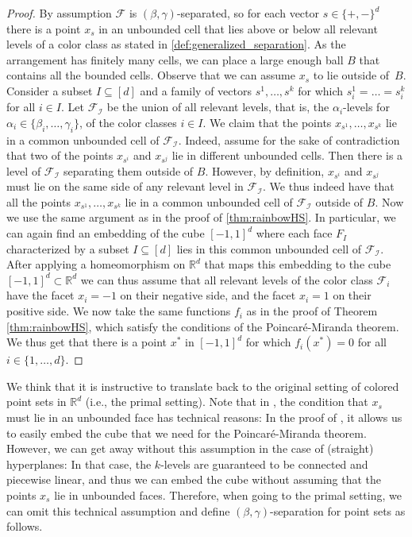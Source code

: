 \documentclass[11pt]{article}
\newcommand{\R}{\mathbb{R}}
\begin{document}
\begin{proof}
By assumption $\mathcal{F}$ is $(\beta,\gamma)$-separated, so for each vector $s \in \{+, -\}^d$ there is a point $x_s$ in an unbounded cell that lies above or below all relevant levels of a color class as stated in \cref{def:generalized_separation}. As the arrangement has finitely many cells, we can place a large enough ball $B$ that contains all the bounded cells. Observe that we can assume $x_s$ to lie outside of~$B$. Consider a subset $I\subseteq [d]$ and a family of vectors $s^1,\ldots,s^k$ for which $s_i^1=\ldots =s_i^k$ for all $i\in I$. Let $\mathcal{F_{I}}$ be the union of all relevant levels, that is, the $\alpha_i$-levels for $\alpha_i \in \{\beta_i, \ldots, \gamma_i\}$, of the color classes $i \in I$. We claim that the points $x_{s^1},\ldots,x_{s^k}$ lie in a common unbounded cell of $\mathcal{F_{I}}$. Indeed, assume for the sake of contradiction that two of the points $x_{s^i}$ and $x_{s^j}$ lie in different unbounded cells. Then there is a level of $\mathcal{F_{I}}$ separating them outside of $B$. However, by definition, $x_{s^i}$ and $x_{s^j}$ must lie on the same side of any relevant level in $\mathcal{F_{I}}$.
%
We thus indeed have that all the points $x_{s^1},\ldots,x_{s^k}$ lie in a common unbounded cell of $\mathcal{F_{I}}$ outside of $B$. 
Now we use the same argument as in the proof of \cref{thm:rainbowHS}.
In particular, we can again find an embedding of the cube $[-1,1]^d$ where each face $F_I$ characterized by a subset $I \subseteq [d]$ 
lies in this common unbounded cell of $\mathcal{F_{I}}$. After applying a homeomorphism on $\mathbb{R}^d$ that maps this embedding to the cube $[-1,1]^d\subset\mathbb{R}^d$ we can thus assume that all relevant levels of the color class $\mathcal{F}_i$ have the facet $x_i=-1$ on their negative side, and the facet $x_i=1$ on their positive side.
%
We now take the same functions $f_i$ as in the proof of Theorem \ref{thm:rainbowHS}, which satisfy the conditions of the Poincar\'{e}-Miranda theorem.
We thus get that there is a point $x^*$ in $[-1,1]^d$ for which $f_i(x^*)=0$ for all $i\in\{1,\ldots,d\}$.
\end{proof}
%
We think that it is instructive to translate  back to the original setting of colored point sets in $\R^d$ (i.e., the primal setting). Note that in , the condition that $x_s$ must lie in an unbounded face has technical reasons: In the proof of , it allows us to easily embed the cube that we need for the Poincar\'{e}-Miranda theorem. However, we can get away without this assumption in the case of (straight) hyperplanes: In that case, the $k$-levels are guaranteed to be connected and piecewise linear, and thus we can embed the cube without assuming that the points $x_s$ lie in unbounded faces. Therefore, when going to the primal setting, we can omit this technical assumption and define $(\beta, \gamma)$-separation for point sets as follows.
\end{document}
